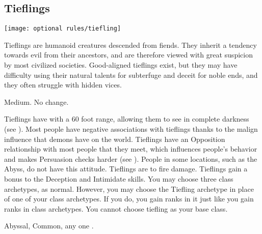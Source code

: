     \subsection{Tieflings}
        \texttt{[image: optional rules/tiefling]}

        Tieflings are humanoid creatures descended from fiends.
        They inherit a tendency towards evil from their ancestors, and are therefore viewed with great suspicion by most civilized societies.
        Good-aligned tieflings exist, but they may have difficulty using their natural talents for subterfuge and deceit for noble ends, and they often struggle with hidden vices.

         Medium.
         No change.
        \begin{itemize}
             Tieflings have  with a 60 foot range, allowing them to see in complete darkness (see ).
             Most people have negative associations with tieflings thanks to the malign influence that demons have on the world.
                Tieflings have an Opposition relationship with most people that they meet, which influences people's behavior and makes Persuasion checks harder (see ).
                People in some locations, such as the Abyss, do not have this attitude.
             Tieflings are  to fire damage.
             Tieflings gain a  bonus to the Deception and Intimidate skills.
             You may choose three class archetypes, as normal.
                However, you may choose the Tiefling archetype in place of one of your class archetypes.
                If you do, you gain ranks in it just like you gain ranks in class archetypes.
                You cannot choose tiefling as your base class.
        \end{itemize}
         Abyssal, Common, any one .


